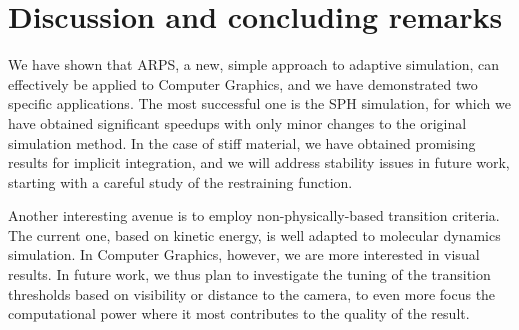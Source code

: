 \section{Discussion and concluding remarks} \label{sec discussion}
We have shown that ARPS, a new, simple approach to adaptive simulation, can effectively be applied to Computer Graphics, and we have demonstrated two specific applications.
The most successful one is the SPH simulation, for which we have obtained significant speedups with only minor changes to the original simulation method.
In the case of stiff material, we have obtained promising results for implicit integration, and we will address stability issues in future work, starting with a careful study of the restraining function.

Another interesting avenue is to employ non-physically-based transition criteria. The current one, based on kinetic energy, is well adapted to molecular dynamics simulation. In Computer Graphics, however, we are more interested in visual results. In future work, we thus plan to investigate the tuning of the transition thresholds based on visibility or distance to the camera, to even more focus the computational power where it most contributes to the quality of the result.
